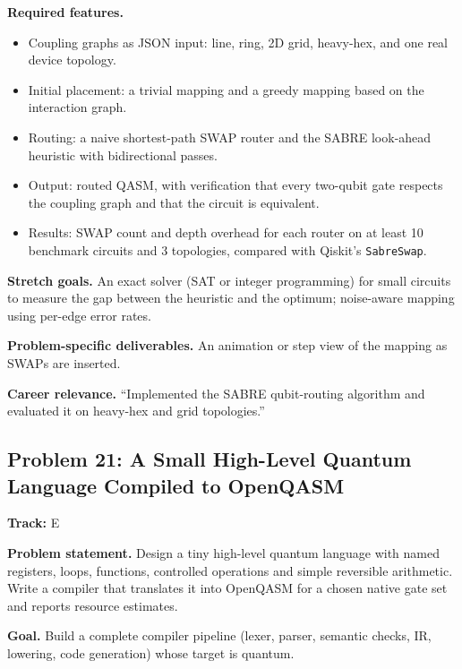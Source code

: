 \documentclass[11pt,a4paper]{article}
\newcommand{\fld}[1]{\par\smallskip\textbf{\color{accent}#1}\quad}
\newcommand{\meta}[1]{%
  \begin{tcolorbox}[colback=softbg,colframe=softbg,boxsep=2pt,left=4pt,right=4pt,top=2pt,bottom=2pt,arc=2pt]
  \small\textbf{Track:} #1
  \end{tcolorbox}}
\begin{document}
\fld{Required features.}
\begin{itemize}
  \item Coupling graphs as JSON input: line, ring, 2D grid, heavy-hex, and one real device topology.
  \item Initial placement: a trivial mapping and a greedy mapping based on the interaction graph.
  \item Routing: a naive shortest-path SWAP router and the SABRE look-ahead heuristic with bidirectional passes.
  \item Output: routed QASM, with verification that every two-qubit gate respects the coupling graph and that the circuit is equivalent.
  \item Results: SWAP count and depth overhead for each router on at least 10 benchmark circuits and 3 topologies, compared with Qiskit's \texttt{SabreSwap}.
\end{itemize}

\fld{Stretch goals.} An exact solver (SAT or integer programming) for small circuits to measure the
gap between the heuristic and the optimum; noise-aware mapping using per-edge error rates.

\fld{Problem-specific deliverables.} An animation or step view of the mapping as SWAPs are inserted.

\fld{Career relevance.} ``Implemented the SABRE qubit-routing algorithm and evaluated it on heavy-hex and grid topologies.''

\subsection{Problem 21: A Small High-Level Quantum Language Compiled to OpenQASM}
\meta{E}

\fld{Problem statement.} Design a tiny high-level quantum language with named registers, loops,
functions, controlled operations and simple reversible arithmetic. Write a compiler that translates
it into OpenQASM for a chosen native gate set and reports resource estimates.

\fld{Goal.} Build a complete compiler pipeline (lexer, parser, semantic checks, IR, lowering, code
generation) whose target is quantum.
\end{document}
